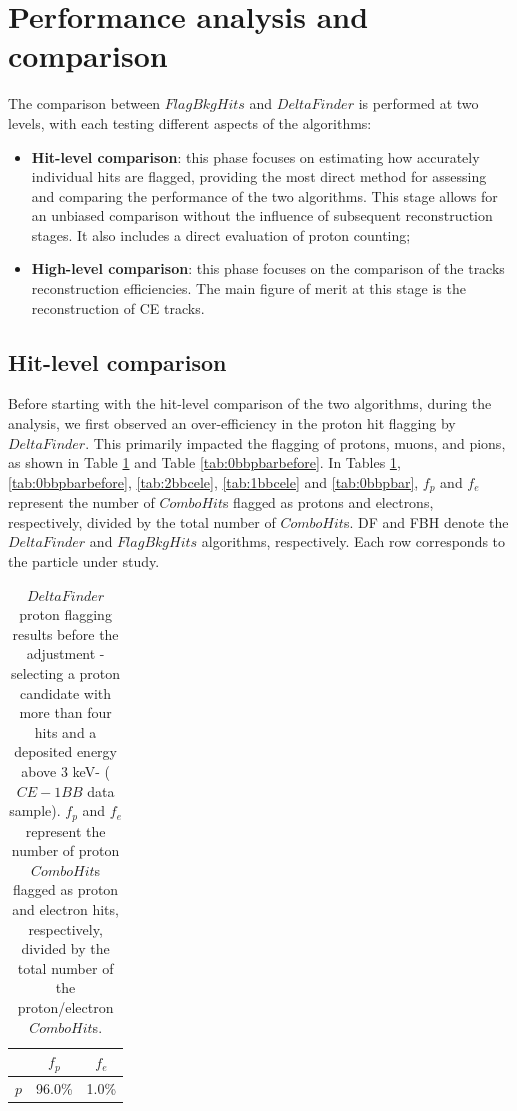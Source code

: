 \section{Performance analysis and comparison}
The comparison between $FlagBkgHits$ and $DeltaFinder$ 
is performed at two levels, with each testing 
different aspects of the algorithms: 
\begin{itemize}
    \item \textbf{Hit-level comparison}: this 
    phase focuses 
    on estimating how accurately individual hits are 
    flagged, providing the most direct method for 
    assessing and comparing the performance of the two 
    algorithms. This stage allows for an unbiased 
    comparison without the influence of subsequent 
    reconstruction stages. It also includes a 
    direct evaluation of proton counting;
    
    \item \textbf{High-level comparison}: this phase focuses on the 
    comparison of the tracks reconstruction efficiencies. The main figure 
    of merit at this stage is the 
    reconstruction of CE tracks.

\end{itemize}

\subsection{Hit-level comparison}
Before starting with the hit-level 
comparison of the two algorithms, during the analysis, 
we first observed an over-efficiency 
in the proton hit flagging by $DeltaFinder$. 
This primarily impacted the flagging of 
protons, muons, and pions, as shown in 
Table \ref{tab:1bbcelebefore} and Table 
\ref{tab:0bbpbarbefore}. In Tables 
\ref{tab:1bbcelebefore}, \ref{tab:0bbpbarbefore}, 
\ref{tab:2bbcele}, \ref{tab:1bbcele} and 
\ref{tab:0bbpbar}, $f_p$ and 
$f_e$ represent 
the number of $ComboHit$s flagged as 
protons and electrons, respectively, 
divided by the total number of 
$ComboHit$s. DF and FBH denote the $DeltaFinder$ 
and $FlagBkgHits$ algorithms, 
respectively. Each row corresponds to the particle 
under study.

\begin{center}
    \begin{table}[h!]
    \centering
    \renewcommand{\arraystretch}{1.}
    \begin{tabular}{| c | c | c |} 
    \hline
    & $f_{p}$ & $f_{e}$ \\
    \hline
    $p$     & 96.0\% & 1.0\% \\
    \hline
    \end{tabular}
    \caption{$DeltaFinder$ proton 
    flagging results before the 
    adjustment -selecting a proton 
    candidate with more than four hits 
    and a deposited energy above 3 keV- ($CE-1BB$ data sample). 
    $f_p$ and $f_e$ represent 
    the number of proton $ComboHit$s 
    flagged as proton and electron hits, respectively, 
    divided by the total number of the proton/electron $ComboHit$s.}
    \label{tab:1bbcelebefore}
    \end{table}
\end{center}
    
